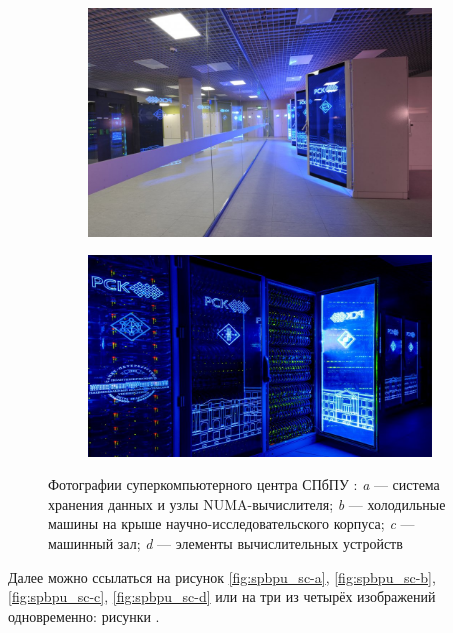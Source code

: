 \begin{figure}[ht]
\begin{subfigure}[t]{\dimexpr.5\linewidth-1.3em\relax}
	\includegraphics[width=.95\linewidth,valign=t]{my_folder/images/spbpu_sc_hall}
\end{subfigure}%
\hfill %
%
\begin{subfigure}[t]{\dimexpr.5\linewidth-1.3em\relax}
	\centering
	\includegraphics[width=.95\linewidth,valign=t]{my_folder/images/spbpu_sc_box}
\end{subfigure}
\captionsetup{justification=centering} %
\caption{Фотографии суперкомпьютерного центра СПбПУ \cite{spbpu-gallery}: {\itshape a} --- система хранения данных и узлы NUMA-вычислителя; {\itshape b} --- холодильные машины на крыше научно-исследовательского корпуса; {\itshape c} --- машинный зал; {\itshape d} --- элементы вычислительных устройств} 
\label{fig:spbpu_sc-four-photos}
\end{figure}

Далее можно ссылаться на рисунок \ref{fig:spbpu_sc-a}, \ref{fig:spbpu_sc-b}, \ref{fig:spbpu_sc-c}, \ref{fig:spbpu_sc-d} или на три из четырёх изображений одновременно: рисунки .